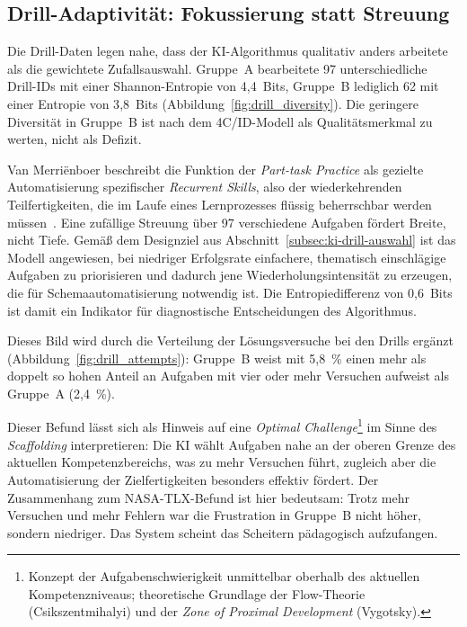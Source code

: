 \subsection{Drill-Adaptivität: Fokussierung statt Streuung}\label{subsec:diskussion_drills}

Die Drill-Daten legen nahe, dass der KI-Algorithmus qualitativ anders arbeitete als die gewichtete Zufallsauswahl. Gruppe~A bearbeitete 97 unterschiedliche Drill-IDs mit einer Shannon-Entropie von 4{,}4~Bits, Gruppe~B lediglich 62 mit einer Entropie von 3{,}8~Bits (Abbildung~\ref{fig:drill_diversity}). Die geringere Diversität in Gruppe~B ist nach dem 4C/ID-Modell als Qualitätsmerkmal zu werten, nicht als Defizit.

Van Merriënboer beschreibt die Funktion der \textit{Part-task Practice} als gezielte Automatisierung spezifischer \textit{Recurrent Skills}, also der wiederkehrenden Teilfertigkeiten, die im Laufe eines Lernprozesses flüssig beherrschbar werden müssen~\cite{vanmerrienboer2018}. Eine zufällige Streuung über 97 verschiedene Aufgaben fördert Breite, nicht Tiefe. Gemäß dem Designziel aus Abschnitt~\ref{subsec:ki-drill-auswahl} ist das Modell angewiesen, bei niedriger Erfolgsrate einfachere, thematisch einschlägige Aufgaben zu priorisieren und dadurch jene Wiederholungsintensität zu erzeugen, die für Schemaautomatisierung notwendig ist. Die Entropiedifferenz von 0{,}6~Bits ist damit ein Indikator für diagnostische Entscheidungen des Algorithmus.

Dieses Bild wird durch die Verteilung der Lösungsversuche bei den Drills ergänzt (Abbildung~\ref{fig:drill_attempts}): Gruppe~B weist mit 5{,}8~\% einen mehr als doppelt so hohen Anteil an Aufgaben mit vier oder mehr Versuchen aufweist als Gruppe~A (2{,}4~\%). 

Dieser Befund lässt sich als Hinweis auf eine \textit{Optimal Challenge}\footnote{Konzept der Aufgabenschwierigkeit unmittelbar oberhalb des aktuellen Kompetenzniveaus; theoretische Grundlage der Flow-Theorie (Csikszentmihalyi) und der \textit{Zone of Proximal Development} (Vygotsky).} im Sinne des \textit{Scaffolding} interpretieren: Die KI wählt Aufgaben nahe an der oberen Grenze des aktuellen Kompetenzbereichs, was zu mehr Versuchen führt, zugleich aber die Automatisierung der Zielfertigkeiten besonders effektiv fördert. Der Zusammenhang zum NASA-TLX-Befund ist hier bedeutsam: Trotz mehr Versuchen und mehr Fehlern war die Frustration in Gruppe~B nicht höher, sondern niedriger. Das System scheint das Scheitern pädagogisch aufzufangen.

